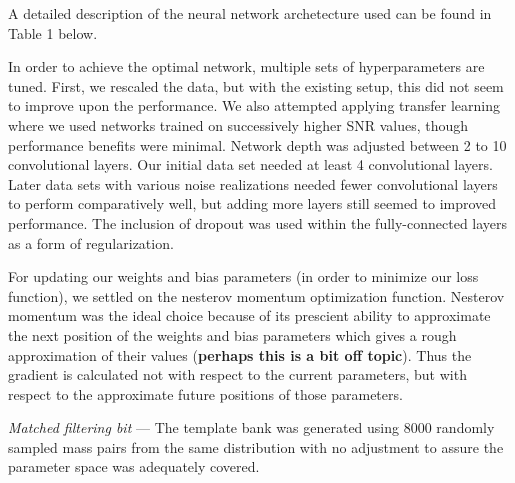 \documentclass[%
 amsmath,amssymb,
 aps,
 twocolumn,
]{revtex4-1}
\begin{document}
A detailed description of the neural network archetecture used can be found in Table 1 below.

In order to achieve the optimal network, multiple sets of hyperparameters are tuned. First, we rescaled the data, but with the existing setup, this did not seem to improve upon the performance. We also attempted applying transfer learning where we used networks trained on successively higher SNR values, though performance benefits were minimal. Network depth was adjusted between 2 to 10 convolutional layers. Our initial data set needed at least 4 convolutional layers. Later data sets with various noise realizations needed fewer convolutional layers to perform comparatively well, but adding more layers still seemed to improved performance. The inclusion of dropout was used within the fully-connected layers as a form of regularization.

For updating our weights and bias parameters (in order to minimize our loss function), we settled on the nesterov momentum optimization function. Nesterov momentum was the ideal choice because of its prescient ability to approximate the next position of the weights and bias parameters which gives a rough approximation of their values (\textbf{perhaps this is a bit off topic}). Thus the gradient is calculated not with respect to the current parameters, but with respect to the approximate future positions of those parameters.

\textit{Matched filtering bit} --- The template bank was generated using 8000 randomly sampled mass pairs from the same distribution with no adjustment to assure the parameter space was adequately covered.   
\end{document}
